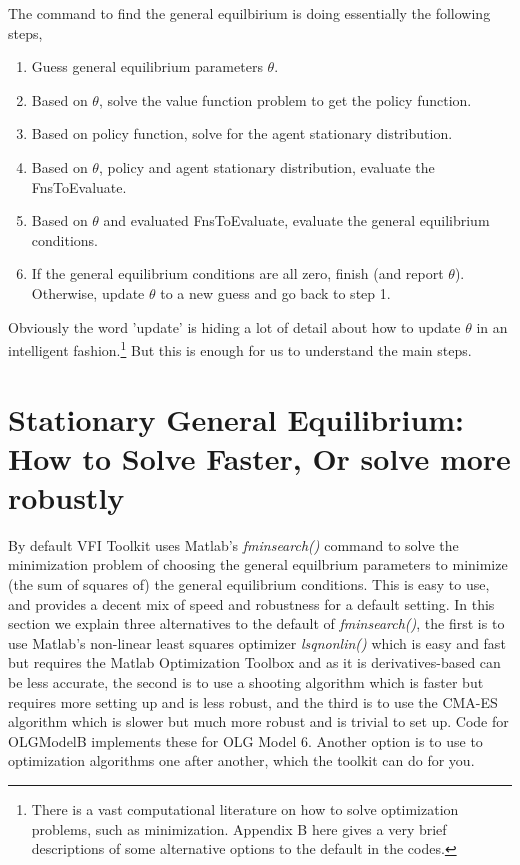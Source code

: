 The command to find the general equilbirium is doing essentially the following steps,
\begin{enumerate}
 \item Guess general equilibrium parameters $\theta$.
 \item Based on $\theta$, solve the value function problem to get the policy function.
 \item Based on policy function, solve for the agent stationary distribution.
 \item Based on $\theta$, policy and agent stationary distribution, evaluate the FnsToEvaluate.
 \item Based on $\theta$ and evaluated FnsToEvaluate, evaluate the general equilibrium conditions.
 \item If the general equilibrium conditions are all zero, finish (and report $\theta$). Otherwise, update $\theta$ to a new guess and go back to step 1.
\end{enumerate}
Obviously the word 'update' is hiding a lot of detail about how to update $\theta$ in an intelligent fashion.\footnote{There is a vast computational literature on how to solve optimization problems, such as minimization. Appendix B here gives a very brief descriptions of some alternative options to the default in the codes.} But this is enough for us to understand the main steps.


\section{Stationary General Equilibrium: How to Solve Faster, Or solve more robustly}
By default VFI Toolkit uses Matlab's \textit{fminsearch()} command to solve the minimization problem of choosing the general equilbrium parameters to minimize (the sum of squares of) the general equilibrium conditions. This is easy to use, and provides a decent mix of speed and robustness for a default setting. In this section we explain three alternatives to the default of \textit{fminsearch()}, the first is to use Matlab's non-linear least squares optimizer \textit{lsqnonlin()} which is easy and fast but requires the Matlab Optimization Toolbox and as it is derivatives-based can be less accurate, the second is to use a shooting algorithm which is faster but requires more setting up and is less robust, and the third is to use the CMA-ES algorithm which is slower but much more robust and is trivial to set up. Code for OLGModelB implements these for OLG Model 6. Another option is to use to optimization algorithms one after another, which the toolkit can do for you.

